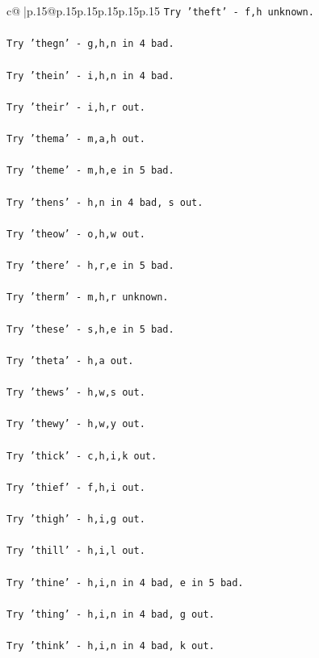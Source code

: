 \documentclass{article}
\begin{document}
{\begin{supertabular}{c@{$\;$}|p{.15\linewidth}@{}p{.15\linewidth}p{.15\linewidth}p{.15\linewidth}p{.15\linewidth}p{.15\linewidth}}
{{{\texttt{Try 'theft' {-} f,h unknown.} \\
\\ 
\texttt{Try 'thegn' {-} g,h,n in 4 bad.} \\
\\ 
\texttt{Try 'thein' {-} i,h,n in 4 bad.} \\
\\ 
\texttt{Try 'their' {-} i,h,r out.} \\
\\ 
\texttt{Try 'thema' {-} m,a,h out.} \\
\\ 
\texttt{Try 'theme' {-} m,h,e in 5 bad.} \\
\\ 
\texttt{Try 'thens' {-} h,n in 4 bad, s out.} \\
\\ 
\texttt{Try 'theow' {-} o,h,w out.} \\
\\ 
\texttt{Try 'there' {-} h,r,e in 5 bad.} \\
\\ 
\texttt{Try 'therm' {-} m,h,r unknown.} \\
\\ 
\texttt{Try 'these' {-} s,h,e in 5 bad.} \\
\\ 
\texttt{Try 'theta' {-} h,a out.} \\
\\ 
\texttt{Try 'thews' {-} h,w,s out.} \\
\\ 
\texttt{Try 'thewy' {-} h,w,y out.} \\
\\ 
\texttt{Try 'thick' {-} c,h,i,k out.} \\
\\ 
\texttt{Try 'thief' {-} f,h,i out.} \\
\\ 
\texttt{Try 'thigh' {-} h,i,g out.} \\
\\ 
\texttt{Try 'thill' {-} h,i,l out.} \\
\\ 
\texttt{Try 'thine' {-} h,i,n in 4 bad, e in 5 bad.} \\
\\ 
\texttt{Try 'thing' {-} h,i,n in 4 bad, g out.} \\
\\ 
\texttt{Try 'think' {-} h,i,n in 4 bad, k out.} \\
}}}
\end{supertabular}}
\end{document}
